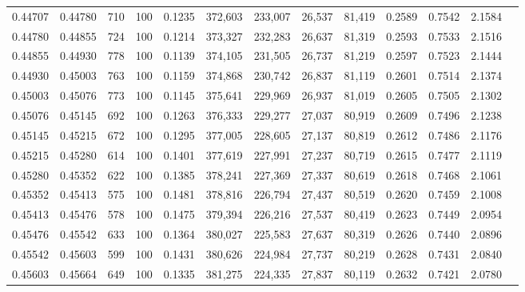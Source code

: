 \begin{tabular}{rrrrrrrrrrrrr}
0.44707 & 0.44780 &   710 & 100 &                                     0.1235 & 372,603 & 233,007 &  26,537 &  81,419 & 0.2589 & 0.7542 & 2.1584 \\
0.44780 & 0.44855 &   724 & 100 &                                     0.1214 & 373,327 & 232,283 &  26,637 &  81,319 & 0.2593 & 0.7533 & 2.1516 \\
0.44855 & 0.44930 &   778 & 100 &                                     0.1139 & 374,105 & 231,505 &  26,737 &  81,219 & 0.2597 & 0.7523 & 2.1444 \\
0.44930 & 0.45003 &   763 & 100 &                                     0.1159 & 374,868 & 230,742 &  26,837 &  81,119 & 0.2601 & 0.7514 & 2.1374 \\
0.45003 & 0.45076 &   773 & 100 &                                     0.1145 & 375,641 & 229,969 &  26,937 &  81,019 & 0.2605 & 0.7505 & 2.1302 \\
0.45076 & 0.45145 &   692 & 100 &                                     0.1263 & 376,333 & 229,277 &  27,037 &  80,919 & 0.2609 & 0.7496 & 2.1238 \\
0.45145 & 0.45215 &   672 & 100 &                                     0.1295 & 377,005 & 228,605 &  27,137 &  80,819 & 0.2612 & 0.7486 & 2.1176 \\
0.45215 & 0.45280 &   614 & 100 &                                     0.1401 & 377,619 & 227,991 &  27,237 &  80,719 & 0.2615 & 0.7477 & 2.1119 \\
0.45280 & 0.45352 &   622 & 100 &                                     0.1385 & 378,241 & 227,369 &  27,337 &  80,619 & 0.2618 & 0.7468 & 2.1061 \\
0.45352 & 0.45413 &   575 & 100 &                                     0.1481 & 378,816 & 226,794 &  27,437 &  80,519 & 0.2620 & 0.7459 & 2.1008 \\
0.45413 & 0.45476 &   578 & 100 &                                     0.1475 & 379,394 & 226,216 &  27,537 &  80,419 & 0.2623 & 0.7449 & 2.0954 \\
0.45476 & 0.45542 &   633 & 100 &                                     0.1364 & 380,027 & 225,583 &  27,637 &  80,319 & 0.2626 & 0.7440 & 2.0896 \\
0.45542 & 0.45603 &   599 & 100 &                                     0.1431 & 380,626 & 224,984 &  27,737 &  80,219 & 0.2628 & 0.7431 & 2.0840 \\
0.45603 & 0.45664 &   649 & 100 &                                     0.1335 & 381,275 & 224,335 &  27,837 &  80,119 & 0.2632 & 0.7421 & 2.0780 \\

\end{tabular}
